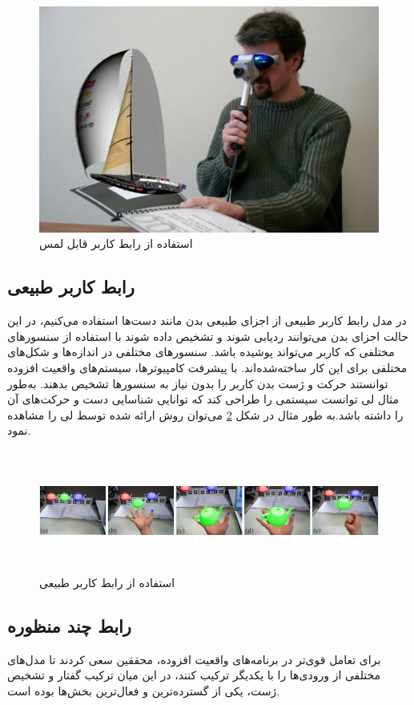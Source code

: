 \begin{figure}[tb]
	\centering
	\includegraphics[width=0.6\linewidth]{image/tar}
	\caption {استفاده از رابط کاربر قابل لمس \cite{Kato}}
	\label{fig:tar}
\end{figure}
\subsection{رابط کاربر طبیعی}
در مدل رابط کاربر طبیعی از اجزای طبیعی بدن مانند دست‌ها استفاده می‌کنیم، در این حالت اجزای بدن می‌توانند ردیابی شوند و تشخیص داده شوند با استفاده از سنسورهای مختلفی که کاربر می‌تواند پوشیده باشد. سنسورهای مختلفی در اندازه‌ها و شکل‌های مختلفی برای این کار ساخته‌شده‌اند.
با پیشرفت کامپیوترها، سیستم‌های واقعیت افزوده توانستند حرکت و ژست بدن کاربر را بدون نیاز به سنسورها تشخیص بدهند. به‌طور مثال لی توانست سیستمی را طراحی کند که توانایی شناسایی دست و حرکت‌های آن را داشته باشد\cite{Lee}.به طور مثال در شکل \ref{fig:lee} می‌توان روش ارائه شده توسط لی را مشاهده نمود.

\begin{figure}[!ht]
	\centering
	\includegraphics[height=4cm,width=1\linewidth]{image/handyar}
	\caption {استفاده از رابط کاربر طبیعی \cite{Lee}}
	\label{fig:lee}
\end{figure}

\subsection{رابط چند منظوره}
برای تعامل قوی‌تر در برنامه‌های واقعیت افزوده، محققین سعی کردند تا مدل‌های مختلفی از ورودی‌ها را با یکدیگر ترکیب کنند، در این میان ترکیب گفتار و تشخیص ژست، یکی از گسترده‌ترین و فعال‌ترین بخش‌ها بوده است.

